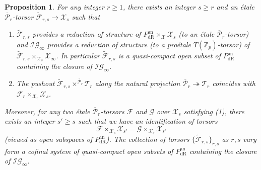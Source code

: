\documentclass[10pt, oneside]{amsart}
\renewcommand{\tilde}{\widetilde}
\numberwithin{equation}{subsection}
\newtheorem{proposition}[equation]{Proposition}
\theoremstyle{definition}
\theoremstyle{remark}
\newcommand{\mbb}[1]{\mathbb{#1}}
\newcommand{\opn}[1]{\operatorname{#1}}
\begin{document}
\begin{proposition} \label{ReductionStructurePdRProposition}
    For any integer $r \geq 1$, there exists an integer $s \geq r$ and an \'{e}tale $\overline{\mathcal{P}}_r$-torsor $\tilde{\mathcal{F}}_{r, s} \to \mathcal{X}_s$ such that
    \begin{enumerate}
        \item $\tilde{\mathcal{F}}_{r, s}$ provides a reduction of structure of $P_{\opn{dR}}^{\opn{an}} \times_{\mathcal{X}} \mathcal{X}_s$ (to an \'{e}tale $\overline{\mathcal{P}}_r$-torsor) and $\mathcal{IG}_{\infty}$ provides a reduction of structure (to a pro\'{e}tale $T(\mbb{Z}_p)$-torsor) of $\tilde{\mathcal{F}}_{r, s} \times_{\mathcal{X}_s} \mathcal{X}_{\infty}$. In particular $\tilde{\mathcal{F}}_{r, s}$ is a quasi-compact open subset of $P_{\opn{dR}}^{\opn{an}}$ containing the closure of $\mathcal{IG}_{\infty}$.
        \item The pushout $\tilde{\mathcal{F}}_{r, s} \times^{\overline{\mathcal{P}}_r} \mathcal{T}_r$ along the natural projection $\overline{\mathcal{P}}_r \twoheadrightarrow \mathcal{T}_r$ coincides with $\mathcal{F}_r \times_{\mathcal{X}_r} \mathcal{X}_s$.
    \end{enumerate}
    Moreover, for any two \'{e}tale $\overline{\mathcal{P}}_{r}$-torsors $\mathscr{F}$ and $\mathscr{G}$ over $\mathcal{X}_s$ satisfying (1), there exists an integer $s' \geq s$ such that we have an identification of torsors
    \begin{equation} \label{FscrequalsGscrTorsors}
    \mathscr{F} \times_{\mathcal{X}_s} \mathcal{X}_{s'} = \mathscr{G} \times_{\mathcal{X}_s} \mathcal{X}_{s'} 
    \end{equation}
    (viewed as open subspaces of $P_{\opn{dR}}^{\opn{an}}$). The collection of torsors $\{ \tilde{\mathcal{F}}_{r, s} \}_{r, s}$ as $r, s$ vary form a cofinal system of quasi-compact open subsets of $P_{\opn{dR}}^{\opn{an}}$ containing the closure of $\mathcal{IG}_{\infty}$.
\end{proposition}
\end{document}

